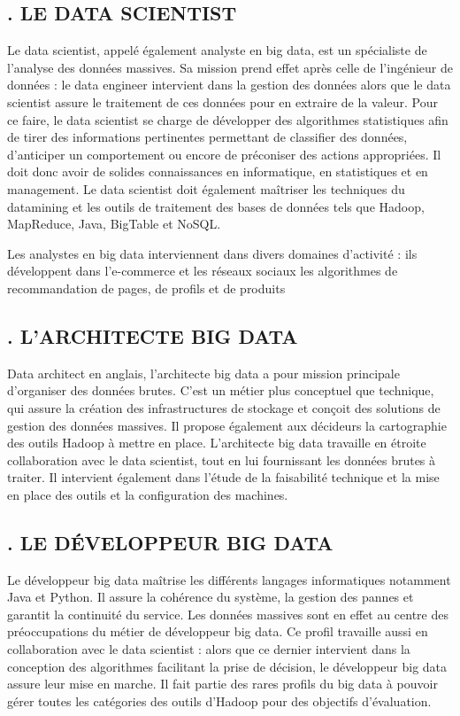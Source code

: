 \subsection*{. LE DATA SCIENTIST}
Le data scientist, appelé également analyste en big data, est un spécialiste de l'analyse des données massives. Sa mission prend effet après celle de l'ingénieur de données : le data engineer intervient dans la gestion des données alors que le data scientist assure le traitement de ces données pour en extraire de la valeur. Pour ce faire, le data scientist se charge de développer des algorithmes statistiques afin de tirer des informations pertinentes permettant de classifier des données, d'anticiper un comportement ou encore de préconiser des actions appropriées. Il doit donc avoir de solides connaissances en informatique, en statistiques et en management. Le data scientist doit également maîtriser les techniques du datamining et les outils de traitement des bases de données tels que Hadoop, MapReduce, Java, BigTable et NoSQL.

Les analystes en big data interviennent dans divers domaines d’activité : ils développent dans l’e-commerce et les réseaux sociaux les algorithmes de recommandation de pages, de profils et de produits

\subsection*{. L’ARCHITECTE BIG DATA}
Data architect en anglais, l'architecte big data a pour mission principale d'organiser des données brutes. C'est un métier plus conceptuel que technique, qui assure la création des infrastructures de stockage et conçoit des solutions de gestion des données massives. Il propose également aux décideurs la cartographie des outils Hadoop à mettre en place. L'architecte big data travaille en étroite collaboration avec le data scientist, tout en lui fournissant les données brutes à traiter. Il intervient également dans l'étude de la faisabilité technique et la mise en place des outils et la configuration des machines.

\subsection*{. LE DÉVELOPPEUR BIG DATA}
Le développeur big data maîtrise les différents langages informatiques notamment Java et Python. Il assure la cohérence du système, la gestion des pannes et garantit la continuité du service. Les données massives sont en effet au centre des préoccupations du métier de développeur big data. Ce profil travaille aussi en collaboration avec le data scientist : alors que ce dernier intervient dans la conception des algorithmes facilitant la prise de décision, le développeur big data assure leur mise en marche. Il fait partie des rares profils du big data à pouvoir gérer toutes les catégories des outils d'Hadoop pour des objectifs d'évaluation.

